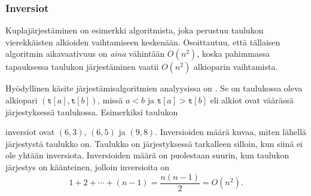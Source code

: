 \begin{center}
\end{center}

\subsubsection{Inversiot}


Kuplajärjestäminen on esimerkki algoritmista,
joka perustuu taulukon vierekkäisten alkioiden
vaihtamiseen keskenään.
Osoittautuu, että tällaisen algoritmin
aikavaativuus on \emph{aina} vähintään $O(n^2)$,
koska pahimmassa tapauksessa taulukon
järjestäminen vaatii $O(n^2)$ alkioparin vaihtamista.

Hyödyllinen käsite järjestämisalgoritmien
analyysissa on .
Se on taulukossa oleva alkiopari
$(\texttt{t}[a],\texttt{t}[b])$,
missä $a<b$ ja $\texttt{t}[a]>\texttt{t}[b]$
eli alkiot ovat väärässä järjestyksessä taulukossa.
Esimerkiksi taulukon
\begin{center}
\end{center}
inversiot ovat $(6,3)$, $(6,5)$ ja $(9,8)$.
Inversioiden määrä kuvaa, miten lähellä
järjestystä taulukko on.
Taulukko on järjestyksessä tarkalleen
silloin, kun siinä ei ole yhtään inversiota.
Inversioiden määrä on puolestaan suurin,
kun taulukon järjestys on käänteinen,
jolloin inversioita on
\[1+2+\cdots+(n-1)=\frac{n(n-1)}{2} = O(n^2).\]


